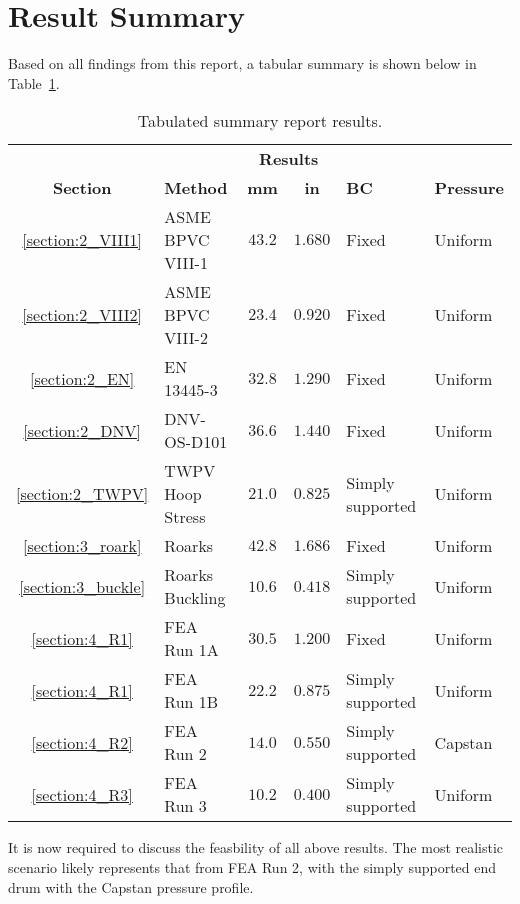 \section{Result Summary}

Based on all findings from this report, a tabular summary is shown below in Table~\ref{table:5_sum}.

\begin{table}[H]
  \centering
  \caption{Tabulated summary report results.}
    \begin{tabular}{clccll}
          &       & \multicolumn{2}{c}{\textbf{Results}} &       &  \\
    \textbf{Section} & \textbf{Method} & \textbf{mm} & \textbf{in} & \textbf{BC} & \textbf{Pressure } \\
    \midrule
          \ref{section:2_VIII1}& ASME BPVC VIII-1 & $43.2$ & $1.680$ & Fixed & Uniform \\
          \ref{section:2_VIII2}& ASME BPVC VIII-2 & $23.4$ & $0.920$ & Fixed & Uniform \\
          \ref{section:2_EN}& EN 13445-3 & $32.8$ & $1.290$ & Fixed & Uniform \\
          \ref{section:2_DNV}& DNV-OS-D101 & $36.6$ & $1.440$ & Fixed & Uniform \\
          \ref{section:2_TWPV}& TWPV Hoop Stress & $21.0$ & $0.825$ & Simply supported & Uniform \\
          \ref{section:3_roark}& Roarks & $42.8$ & $1.686$ & Fixed & Uniform \\
          \ref{section:3_buckle}& Roarks Buckling & $10.6$ & $0.418$ & Simply supported & Uniform \\
          \ref{section:4_R1}& FEA Run 1A & $30.5$ & $1.200$ & Fixed & Uniform \\
          \ref{section:4_R1}& FEA Run 1B & $22.2$ & $0.875$ & Simply supported & Uniform \\
          \ref{section:4_R2}& FEA Run 2 & $14.0$ & $0.550$ & Simply supported & Capstan \\
          \ref{section:4_R3}& FEA Run 3 & $10.2$ & $0.400$ & Simply supported & Uniform \\
    \end{tabular}
  \label{table:5_sum}
\end{table}%

It is now required to discuss the feasbility of all above results. The most realistic scenario likely represents that from FEA Run 2, with the simply supported end drum with the Capstan pressure profile.\\

